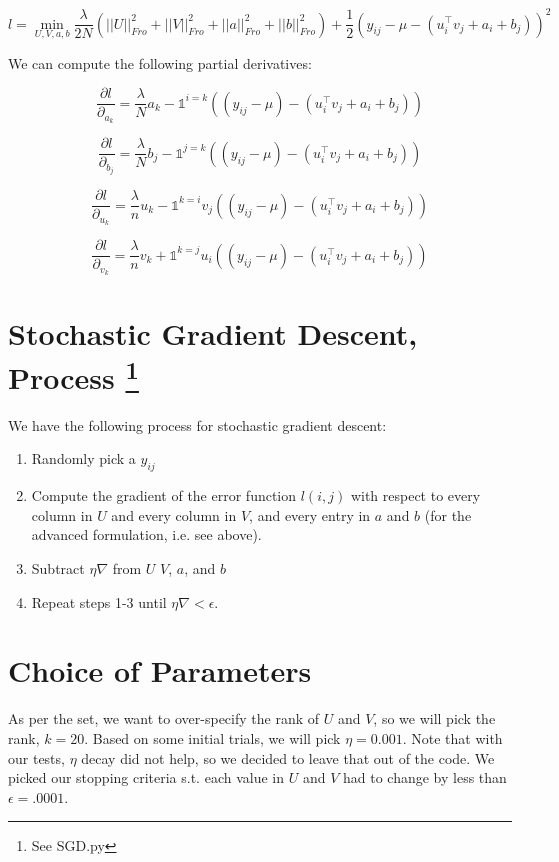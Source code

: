 \documentclass{article}
\begin{document}
$$ l =  \min_{U, V, a, b} \frac{\lambda}{2N} (||U||^{2}_{Fro} + ||V||^{2}_{Fro}
+ ||a||^{2}_{Fro} + ||b||^{2}_{Fro}) + \frac{1}{2} (y_{ij} - \mu - (u_{i}^{\intercal}v_{j} + a_{i} + b_{j}))^{2} $$

We can compute the following partial derivatives:

$$ \frac{\partial l}{\partial_{a_{k}}} = \frac{\lambda}{N} a_{k} - \mathds{1}^{i = k}((y_{ij} - \mu) -
(u_{i}^{\intercal}v_{j} + a_{i} + b_{j})) $$

$$ \frac{\partial l}{\partial_{b_{j}}} = \frac{\lambda}{N} b_{j} - \mathds{1}^{j=k}((y_{ij} - \mu) -
(u_{i}^{\intercal}v_{j} + a_{i} + b_{j})) $$


$$ \frac{\partial l}{\partial_{u_{k}}} = \frac{\lambda}{n} u_{k} - \mathds{1}^{k = i} v_{j}((y_{ij} - \mu) -
(u_{i}^{\intercal}v_{j} + a_{i} + b_{j}))  $$

$$ \frac{\partial l}{\partial_{v_{k}}} = \frac{\lambda}{n} v_{k} + \mathds{1}^{k = j} u_{i}((y_{ij} - \mu) -
(u_{i}^{\intercal}v_{j} + a_{i} + b_{j})) $$

\section*{Stochastic Gradient Descent, Process \footnote{See SGD.py}}

We have the following process for stochastic gradient descent:

\begin{enumerate}
    \item Randomly pick a $y_{ij}$
    \item Compute the gradient of the error function $l(i,j)$ with respect to every
        column in $U$ and every column in $V$, and every entry in $a$ and $b$
        (for the advanced formulation, i.e. see above).
    \item Subtract $\eta \nabla$ from $U$ $V$, $a$, and $b$
    \item Repeat steps 1-3 until $\eta \nabla < \epsilon$.
\end{enumerate}


\section*{Choice of Parameters}
As per the set, we want to over-specify the rank of $U$ and $V$, so we will
pick the rank, $k = 20$. Based on some initial trials, we will pick $\eta = 0.001$.
Note that with our tests, $\eta$ decay did not help, so we decided to leave that
out of the code. We picked our stopping criteria s.t. each value in $U$ and $V$
had to change by less than $\epsilon = .0001$.
\end{document}
